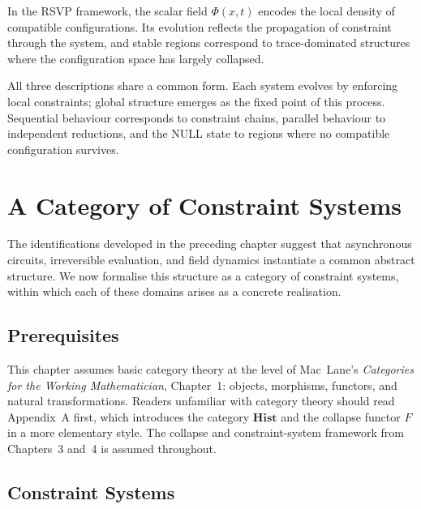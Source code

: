 \documentclass[12pt, oneside]{amsbook}
\theoremstyle{plain}
\theoremstyle{definition}
\theoremstyle{remark}
\newcommand{\RSVPfield}{\Phi}
\begin{document}
In the RSVP framework, the scalar field $\RSVPfield(x,t)$ encodes the local
density of compatible configurations. Its evolution reflects the propagation of
constraint through the system, and stable regions correspond to trace-dominated
structures where the configuration space has largely collapsed.

All three descriptions share a common form. Each system evolves by enforcing
local constraints; global structure emerges as the fixed point of this process.
Sequential behaviour corresponds to constraint chains, parallel behaviour to
independent reductions, and the NULL state to regions where no compatible
configuration survives.


\chapter{A Category of Constraint Systems}
\label{ch:constr}

The identifications developed in the preceding chapter suggest that
asynchronous circuits, irreversible evaluation, and field dynamics instantiate
a common abstract structure. We now formalise this structure as a category of
constraint systems, within which each of these domains arises as a concrete
realisation.

\section{Prerequisites}

This chapter assumes basic category theory at the level of Mac~Lane's \textit{Categories for the Working Mathematician}, Chapter~1: objects, morphisms, functors, and natural transformations. Readers unfamiliar with category theory should read Appendix~A first, which introduces the category $\mathbf{Hist}$ and the collapse functor $F$ in a more elementary style. The collapse and constraint-system framework from Chapters~3 and~4 is assumed throughout.

\section{Constraint Systems}
\label{sec:constr:defn}
\end{document}
